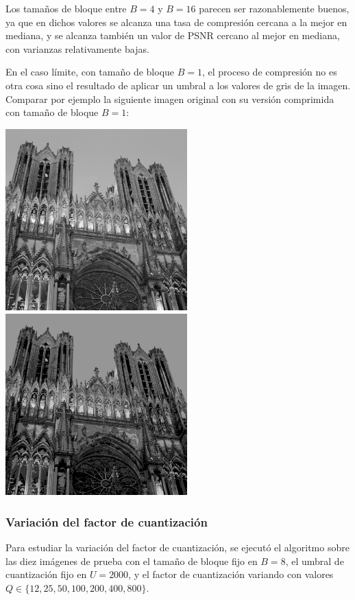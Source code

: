 \documentclass{article}
\newcommand{\set}[1]{\{#1\}}
\begin{document}
Los tamaños de bloque entre $B = 4$ y $B = 16$ parecen ser razonablemente
buenos,
ya que en dichos valores se alcanza una tasa de compresión cercana a la
mejor en mediana,
y se alcanza también un valor de PSNR cercano al mejor en mediana,
con varianzas relativamente bajas.

\bigskip
En el caso límite, con tamaño de bloque $B = 1$, el proceso de
compresión no es otra cosa sino el resultado de aplicar un umbral
a los valores de gris de la imagen.
Comparar por ejemplo la siguiente imagen original con su versión
comprimida con tamaño de bloque $B = 1$:
\begin{center}
\includegraphics[width=7cm]{../imgs/input/imgs_gray/img04.png}
\includegraphics[width=7cm]{../imgs/output/gray_1_50_2000/img04.png}
\end{center}

\subsubsection{Variación del factor de cuantización}
\label{sec:variacion_factor_cuantizacion}

Para estudiar la variación del factor de cuantización, se ejecutó el
algoritmo sobre las diez imágenes de prueba con el
tamaño de bloque fijo en $B = 8$,
el umbral de cuantización fijo en $U = 2000$,
y el factor de cuantización variando con valores
$Q \in \set{12,25,50,100,200,400,800}$.
\end{document}
